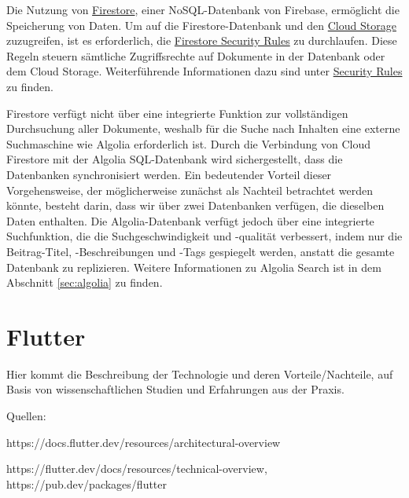 Die Nutzung von \href{https://firebase.google.com/docs/firestore}{Firestore}, einer NoSQL-Datenbank von Firebase, ermöglicht die Speicherung von Daten. Um auf die Firestore-Datenbank und den \href{https://firebase.google.com/docs/storage}{Cloud Storage} zuzugreifen, ist es erforderlich, die \href{https://firebase.google.com/docs/firestore/security/overview}{Firestore Security Rules} zu durchlaufen. Diese Regeln steuern sämtliche Zugriffsrechte auf Dokumente in der Datenbank oder dem Cloud Storage. Weiterführende Informationen dazu sind unter \hyperref[sec:security-rules]{Security Rules} zu finden.

Firestore verfügt nicht über eine integrierte Funktion zur
vollständigen Durchsuchung aller Dokumente, weshalb für die
Suche nach Inhalten eine externe Suchmaschine wie Algolia
erforderlich ist. Durch die Verbindung von Cloud Firestore
mit der Algolia SQL-Datenbank wird sichergestellt, dass die
Datenbanken synchronisiert werden. Ein bedeutender Vorteil
dieser Vorgehensweise, der möglicherweise zunächst als
Nachteil betrachtet werden könnte, besteht darin, dass wir
über zwei Datenbanken verfügen, die dieselben Daten
enthalten. Die Algolia-Datenbank verfügt jedoch über eine
integrierte Suchfunktion, die die Suchgeschwindigkeit und
-qualität verbessert, indem nur die Beitrag-Titel,
-Beschreibungen und -Tags gespiegelt werden, anstatt die
gesamte Datenbank zu replizieren. Weitere Informationen zu
Algolia Search ist in dem Abschnitt \ref{sec:algolia} zu finden.

\section{Flutter}

Hier kommt die Beschreibung der Technologie und deren Vorteile/Nachteile, auf Basis von wissenschaftlichen Studien und Erfahrungen aus der Praxis.

Quellen:

https://docs.flutter.dev/resources/architectural-overview

https://flutter.dev/docs/resources/technical-overview,
https://pub.dev/packages/flutter



